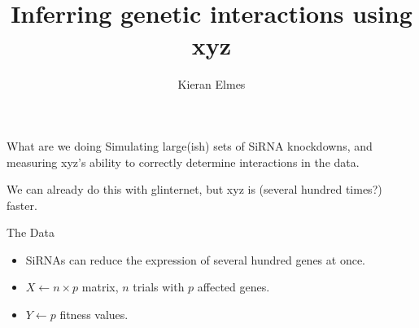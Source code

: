 \documentclass[8pt]{beamer}
\title{Inferring genetic interactions using xyz}
\author{Kieran Elmes}
\begin{document}
\begin{frame}[plain]
    \maketitle
\end{frame}
\begin{frame}{What are we doing}
Simulating large(ish) sets of SiRNA knockdowns, and measuring xyz's ability to correctly determine interactions in the data.

We can already do this with glinternet, but xyz is (several hundred times?) faster.


\end{frame}
\begin{frame}{The Data}
\begin{itemize}
	\item SiRNAs can reduce the expression of several hundred genes at once.
	\item $X \leftarrow n \times p$ matrix, $n$ trials with $p$ affected genes.
	\item $Y \leftarrow p$ fitness values.
\end{itemize}


\end{frame}
\end{document}
